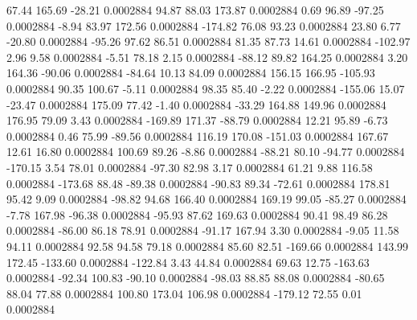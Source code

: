        67.44      165.69      -28.21     0.0002884
       94.87       88.03      173.87     0.0002884
        0.69       96.89      -97.25     0.0002884
       -8.94       83.97      172.56     0.0002884
     -174.82       76.08       93.23     0.0002884
       23.80        6.77      -20.80     0.0002884
      -95.26       97.62       86.51     0.0002884
       81.35       87.73       14.61     0.0002884
     -102.97        2.96        9.58     0.0002884
       -5.51       78.18        2.15     0.0002884
      -88.12       89.82      164.25     0.0002884
        3.20      164.36      -90.06     0.0002884
      -84.64       10.13       84.09     0.0002884
      156.15      166.95     -105.93     0.0002884
       90.35      100.67       -5.11     0.0002884
       98.35       85.40       -2.22     0.0002884
     -155.06       15.07      -23.47     0.0002884
      175.09       77.42       -1.40     0.0002884
      -33.29      164.88      149.96     0.0002884
      176.95       79.09        3.43     0.0002884
     -169.89      171.37      -88.79     0.0002884
       12.21       95.89       -6.73     0.0002884
        0.46       75.99      -89.56     0.0002884
      116.19      170.08     -151.03     0.0002884
      167.67       12.61       16.80     0.0002884
      100.69       89.26       -8.86     0.0002884
      -88.21       80.10      -94.77     0.0002884
     -170.15        3.54       78.01     0.0002884
      -97.30       82.98        3.17     0.0002884
       61.21        9.88      116.58     0.0002884
     -173.68       88.48      -89.38     0.0002884
      -90.83       89.34      -72.61     0.0002884
      178.81       95.42        9.09     0.0002884
      -98.82       94.68      166.40     0.0002884
      169.19       99.05      -85.27     0.0002884
       -7.78      167.98      -96.38     0.0002884
      -95.93       87.62      169.63     0.0002884
       90.41       98.49       86.28     0.0002884
      -86.00       86.18       78.91     0.0002884
      -91.17      167.94        3.30     0.0002884
       -9.05       11.58       94.11     0.0002884
       92.58       94.58       79.18     0.0002884
       85.60       82.51     -169.66     0.0002884
      143.99      172.45     -133.60     0.0002884
     -122.84        3.43       44.84     0.0002884
       69.63       12.75     -163.63     0.0002884
      -92.34      100.83      -90.10     0.0002884
      -98.03       88.85       88.08     0.0002884
      -80.65       88.04       77.88     0.0002884
      100.80      173.04      106.98     0.0002884
     -179.12       72.55        0.01     0.0002884
